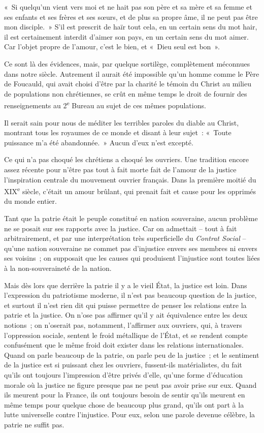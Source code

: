 \documentclass[french,twoside]{book} %
\begin{document}
« Si quelqu'un vient vers moi et ne hait pas son père et sa mère et sa femme et ses enfants et ses frères et ses sœurs, et de plus sa propre âme, il ne peut pas être mon disciple. » S'il est prescrit de haïr tout cela, en un certain sens du mot hair, il est certainement interdit d'aimer son pays, en un certain sens du mot aimer. Car l'objet propre de l'amour, c'est le bien, et « Dieu seul est bon ».\par
Ce sont là des évidences, mais, par quelque sortilège, complètement méconnues dans notre siècle. Autrement il aurait été impossible qu'un homme comme le Père de Foucauld, qui avait choisi d'être par la charité le témoin du Christ au milieu de populations non chrétiennes, se crût en même temps le droit de fournir des renseignements au 2\textsuperscript{e} Bureau au sujet de ces mêmes populations.\par
Il serait sain pour nous de méditer les terribles paroles du diable au Christ, montrant tous les royaumes de ce monde et disant à leur sujet : « Toute puissance m'a été abandonnée. » Aucun d'eux n'est excepté.\par
Ce qui n'a pas choqué les chrétiens a choqué les ouvriers. Une tradition encore assez récente pour n'être pas tout à fait morte fait de l'amour de la justice l'inspiration centrale du mouvement ouvrier français. Dans la première moitié du XIX\textsuperscript{e} siècle, c'était un amour brûlant, qui prenait fait et cause pour les opprimés du monde entier.\par
Tant que la patrie était le peuple constitué en nation souveraine, aucun problème ne se posait sur ses rapports avec la justice. Car on admettait – tout à fait arbitrairement, et par une interprétation très superficielle du {\itshape Contrat Social} – qu'une nation souveraine ne commet pas d'injustice envers ses membres ni envers ses voisins ; on supposait que les causes qui produisent l'injustice sont toutes liées à la non-souveraineté de la nation.\par
Mais dès lors que derrière la patrie il y a le vieil État, la justice est loin. Dans l'expression du patriotisme moderne, il n'est pas beaucoup question de la justice, et surtout il n'est rien dit qui puisse permettre de penser les relations entre la patrie et la justice. On n'ose pas affirmer qu'il y ait équivalence entre les deux notions ; on n'oserait pas, notamment, l'affirmer aux ouvriers, qui, à travers l’oppression sociale, sentent le froid métallique de l'État, et se rendent compte confusément que le même froid doit exister dans les relations internationales. Quand on parle beaucoup de la patrie, on parle peu de la justice ; et le sentiment de la justice est si puissant chez les ouvriers, fussent-ils matérialistes, du fait qu'ils ont toujours l'impression d'être privés d'elle, qu'une forme d'éducation morale où la justice ne figure presque pas ne peut pas avoir prise sur eux. Quand ils meurent pour la France, ils ont toujours besoin de sentir qu'ils meurent en même temps pour quelque chose de beaucoup plus grand, qu'ils ont part à la lutte universelle contre l'injustice. Pour eux, selon une parole devenue célèbre, la patrie ne suffit pas.\par
\end{document}

